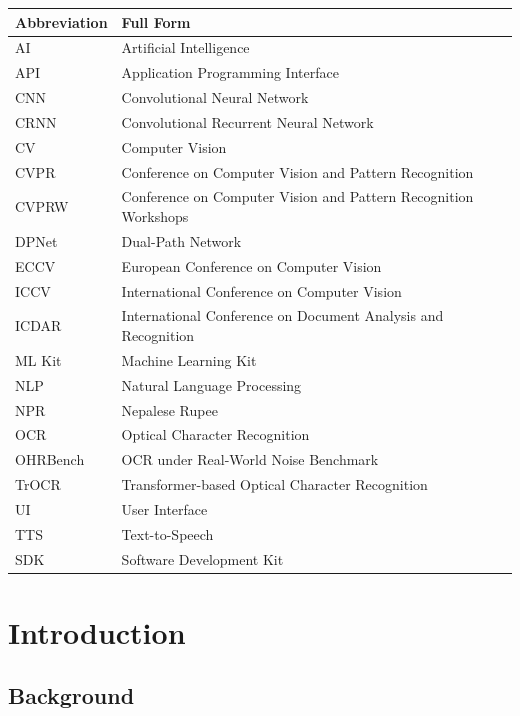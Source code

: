 \documentclass[12pt,a4paper]{report}
\begin{document}
\begin{longtable}{|p{4cm}|p{8cm}|}
\hline
\textbf{Abbreviation} & \textbf{Full Form} \\ \hline
AI & Artificial Intelligence \\ \hline
API & Application Programming Interface \\ \hline
CNN & Convolutional Neural Network \\ \hline
CRNN & Convolutional Recurrent Neural Network \\ \hline
CV & Computer Vision \\ \hline
CVPR & Conference on Computer Vision and Pattern Recognition \\ \hline
CVPRW & Conference on Computer Vision and Pattern Recognition Workshops \\ \hline
DPNet & Dual-Path Network \\ \hline
ECCV & European Conference on Computer Vision \\ \hline
ICCV & International Conference on Computer Vision \\ \hline
ICDAR & International Conference on Document Analysis and Recognition \\ \hline
ML Kit & Machine Learning Kit \\ \hline
NLP & Natural Language Processing \\ \hline
NPR & Nepalese Rupee \\ \hline
OCR & Optical Character Recognition \\ \hline
OHRBench & OCR under Real-World Noise Benchmark \\ \hline
TrOCR & Transformer-based Optical Character Recognition \\ \hline
UI & User Interface \\ \hline
TTS & Text-to-Speech \\ \hline
SDK & Software Development Kit \\ \hline
\end{longtable}


\chapter{Introduction}

\section{Background}
\end{document}
